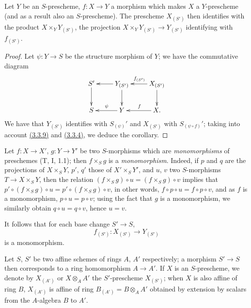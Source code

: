 \begin{cor}[3.3.11]
\label{cor-1.3.3.11}
Let $Y$ be an $S$-prescheme, $f:X\to Y$ a morphism which makes $X$ a
$Y$-prescheme (and as a result also an $S$-prescheme). The prescheme $X_{(S')}$
then identifies with the product $X\times_Y Y_{(S')}$, the projection
$X\times_Y Y_{(S')}\to Y_{(S')}$ identifying with $f_{(S')}$.
\end{cor}

\begin{proof}
\label{proof-cor-1.3.3.11}
Let $\psi:Y\to S$ be the structure morphism of $Y$; we have the commutative
diagram
\[
  \xymatrix{
    S'\ar[d] &
    Y_{(S')}\ar[l]\ar[d] &
    X_{(S')}\ar[l]_{f_{(S')}}\ar[d]\\
    S &
    Y\ar[l]_\psi &
    X\ar[l]_f.
  }
\]
We have that $Y_{(S')}$ identifies with $S_{(\psi)}'$ and $X_{(S')}$ with
$S_{(\psi\circ f)}'$; taking into account \hyperref[prop-1.3.3.9]{(3.3.9)} and
\hyperref[cor-1.3.3.4]{(3.3.4)}, we deduce the corollary.
\end{proof}

\begin{env}[3.3.12]
\label{env-1.3.3.12}
Let $f:X\to X'$, $g:Y\to Y'$ be two $S$-morphisms which are {\em monomorphisms}
of preschemes (T, I, 1.1); then $f\times_S g$ is a {\em monomorphism}. Indeed,
if $p$ and $q$ are the projections of $X\times_S Y$, $p'$, $q'$ those of
$X'\times_S Y'$, and $u$, $v$ two $S$-morphisms $T\to X\times_S Y$, then the
relation $(f\times_S g)\circ u=(f\times_S g)\circ v$ implies that
$p'\circ(f\times_S g)\circ u=p'\circ(f\times_S g)\circ v$, in other words,
$f\circ p\circ u=f\circ p\circ v$, and as $f$ is a monomorphism,
$p\circ u=p\circ v$; using the fact that $g$ is a monomorphism, we similarly
obtain $q\circ u=q\circ v$, hence $u=v$.

It follows that for each base change $S'\to S$,
\[
  f_{(S')}:X_{(S')}\longrightarrow Y_{(S')}
\]
is a monomorphism.
\end{env}

\begin{env}[3.3.13]
\label{env-1.3.3.13}
Let $S$, $S'$ be two affine schemes of rings $A$, $A'$ respectively; a morphism
$S'\to S$ then corresponds to a ring homomorphism $A\to A'$. If $X$ is an
$S$-prescheme, we denote by $X_{(A')}$ or $X\otimes_A A'$ the $S'$-prescheme
$X_{(S')}$; when $X$ is also affine of ring $B$, $X_{(A')}$ is affine of ring
$B_{(A')}=B\otimes_A A'$ obtained by extension by scalars from the $A$-algebra
$B$ to $A'$.
\end{env}

